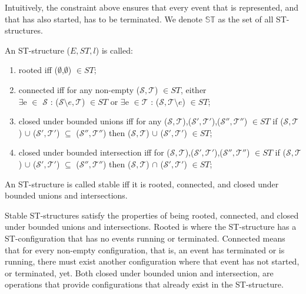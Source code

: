    Intuitively, the constraint above ensures that every event that is represented, and that has also started, has to be terminated. We denote $\mathbb{S} \mathbb{T}$ as the set of all ST-structures.
    
    \begin{definition}
        \label{def:stable st-structures}
        An ST-structure ($E, ST,l$) is called:
        
        \begin{enumerate}
            \item rooted iff ($\emptyset$,$\emptyset$) $\in ST$;
            \item connected iff for any non-empty ($\mathcal{S},\mathcal{T}$) $\in ST$, either \\
            $\exists$e $\in$ $\mathcal{S}$ : ($\mathcal{S}\setminus e, \mathcal{T}$) $\in ST$ or $\exists$e $\in \mathcal{T}$ : ($\mathcal{S}, \mathcal{T}\setminus e$) $\in ST$;
            \item closed under bounded unions iff for any ($\mathcal{S},\mathcal{T}$),($\mathcal{S}',\mathcal{T}'$),($\mathcal{S}'',\mathcal{T}''$) $\in ST$ if ($\mathcal{S},\mathcal{T}$) $\cup$ ($\mathcal{S}',\mathcal{T}'$) $\subseteq$ ($\mathcal{S}'',\mathcal{T}''$) then ($\mathcal{S},\mathcal{T}$) $\cup$ ($\mathcal{S}',\mathcal{T}'$) $\in ST$;
            \item closed under bounded intersection iff for ($\mathcal{S},\mathcal{T}$),($\mathcal{S}',\mathcal{T}'$),($\mathcal{S}'',\mathcal{T}''$) $\in ST$ if ($\mathcal{S},\mathcal{T}$) $\cup$ ($\mathcal{S}',\mathcal{T}'$) $\subseteq$ ($\mathcal{S}'',\mathcal{T}''$) then ($\mathcal{S},\mathcal{T}$) $\cap$ ($\mathcal{S}',\mathcal{T}'$) $\in ST$;
        \end{enumerate}
        
        An ST-structure is called stable iff it is rooted, connected, and closed under bounded unions and intersections.
    \end{definition}
    
    Stable ST-structures satisfy the properties of being rooted, connected, and closed under bounded unions and intersections. Rooted is where the ST-structure has a ST-configuration that has no events running or terminated. Connected means that for every non-empty configuration, that is, an event has terminated or is running, there must exist another configuration where that event has not started, or terminated, yet. Both closed under bounded union and intersection, are operations that provide configurations that already exist in the ST-structure.
    

